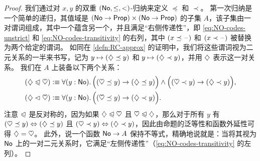 \begin{proof}
  我们通过对 $x, y$ 的双重 $(\mathsf{No},\le,<)$-归纳来定义 $\preceq$ 和 $\prec$。
  第一次归纳是一个简单的递归，其值域是 $(\mathsf{No}\to\mathsf{Prop})\times (\mathsf{No}\to\mathsf{Prop})$ 的子集 $A$，该子集由一对谓词组成，其中一个蕴含另一个，并且满足“右侧传递性”，即 \eqref{eq:NO-codes-unstrict} 和 \eqref{eq:NO-codes-transitivity} 的右列，其中 $(x\preceq \mathord{\hspace{1pt}\text{--}\hspace{1pt}})$ 和 $(x\prec \mathord{\hspace{1pt}\text{--}\hspace{1pt}})$ 被替换为两个给定的谓词。
  如同在 \cref{defn:RC-approx} 的证明中，我们将这些谓词视为二元关系的一半来书写，记为 $y\mapsto (\diamondsuit\preceq y)$ 和 $y\mapsto (\diamondsuit\prec y)$，并用 $\diamondsuit$ 表示这一对关系。
  我们在 $A$ 上装备以下两个关系：
  \begin{align*}
    (\hlname \ble \hlbname) &\defeq
    \fall{y:\NO} \Big( (\hleb y) \to (\hle y) \Big) \land
    \Big( (\hltb y) \to (\hlt y) \Big),\\
    (\hlname \blt \hlbname) &\defeq
    \fall{y:\NO} \Big( (\hleb y) \to (\hlt y) \Big).
  \end{align*}
  注意 $\trianglelefteqslant$ 是反对称的，因为如果 $\diamondsuit \trianglelefteqslant \heartsuit$ 且 $\heartsuit \trianglelefteqslant \diamondsuit$，那么对于所有 $y$ 有 $(\heartsuit\preceq y) \Leftrightarrow (\diamondsuit\preceq y)$ 且 $(\heartsuit\prec y) \Leftrightarrow (\diamondsuit\prec y)$，因此由命题的泛等性和函数外延性可得 $\diamondsuit=\heartsuit$。
  此外，说一个函数 $\mathsf{No}\to A$ 保持不等式，精确地说就是：当将其视为 $\mathsf{No}$ 上的一对二元关系时，它满足“左侧传递性”（\eqref{eq:NO-codes-transitivity} 的左列）。


\end{proof}
